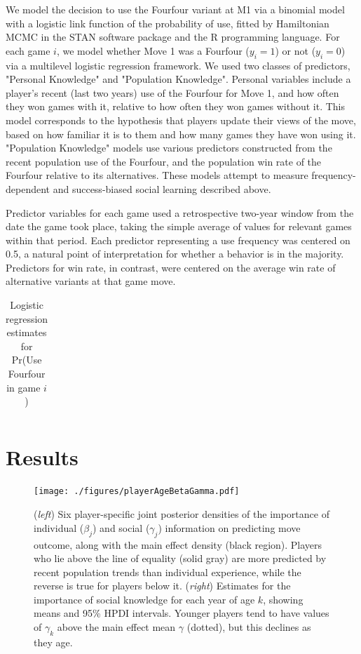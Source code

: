 \documentclass[reqno,12pt]{amsart}
\begin{document}
We model the decision to use the Fourfour variant at M1 via a binomial model with a logistic link function of the probability of use, fitted by Hamiltonian MCMC in the STAN software package \citep{stan2013stan} and the R programming language. For each game $i$, we model whether Move 1 was a Fourfour ($y_i=1$) or not ($y_i=0$) via a multilevel logistic regression framework. We used two classes of predictors, "Personal Knowledge" and "Population Knowledge". Personal variables include a player's recent (last two years) use of the Fourfour for Move 1, and how often they won games with it, relative to how often they won games without it. This model corresponds to the hypothesis that players update their views of the move, based on how familiar it is to them and how many games they have won using it. "Population Knowledge" models use various predictors constructed from the recent population use of the Fourfour, and the population win rate of the Fourfour relative to its alternatives. These models attempt to measure frequency-dependent and success-biased social learning described above.

Predictor variables for each game used a retrospective two-year window from the date the game took place, taking the simple average of values for relevant games within that period. Each predictor representing a use frequency was centered on 0.5, a natural point of interpretation for whether a behavior is in the majority. Predictors for win rate, in contrast, were centered on the average win rate of alternative variants at that game move.

\begin{table}[t]
  \centering
    \begin{tabular}{lrr}
    
    \end{tabular}
  \caption{Logistic regression estimates for Pr(Use Fourfour in game $i$)}
  \label{table:pr44_logistic_coefs}
\end{table}

\section{Results}

\begin{figure}[t]
  \begin{center}
    \texttt{[image: ./figures/playerAgeBetaGamma.pdf]}
    \caption{(\textit{left}) Six player-specific joint posterior densities of the importance of individual ($\beta_j$) and social ($\gamma_j$) information on predicting move outcome, along with the main effect density (black region). Players who lie above the line of equality (solid gray) are more predicted by recent population trends than individual experience, while the reverse is true for players below it. (\textit{right}) Estimates for the importance of social knowledge for each year of age $k$, showing means and 95\% HPDI intervals. Younger players tend to have values of $\gamma_k$ above the main effect mean $\gamma$ (dotted), but this declines as they age.}
  \label{fig:playerAgeBetaGamma}
  \end{center}
\end{figure}
\end{document}
